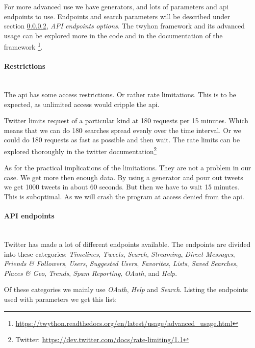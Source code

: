 For more advanced use we have generators, and lots of parameters and api
endpoints to use. Endpoints and search parameters will be described under
section \ref{data:twitter:endpoints}, \textit{API endpoints options}. 
The twyhon framework and its advanced usage can be explored more in the code and
in the documentation of the framework
\footnote{\url{https://twython.readthedocs.org/en/latest/usage/advanced_usage.html}}.
%

\paragraph{Restrictions}
\hspace{0pt}\\
The api has some access restrictions. Or rather rate limitations. This is to be
expected, as unlimited access would cripple the api.

Twitter limits request of a particular kind at 180 requests per 15 minutes.
Which means that we can do 180 searches spread evenly over the time interval. Or
we could do 180 requests as fast as possible and then wait. The rate limits can
be explored thoroughly in the twitter documentation\footnote{Twitter:
\url{https://dev.twitter.com/docs/rate-limiting/1.1}}

As for the practical implications  of the limitations. They are not a problem in
our case. We get more then enough data. By using a generator and pour out tweets
we get 1000 tweets in about 60 seconds. But then we have to wait 15 minutes.
This is suboptimal. As we will crash the program at access denied from the api.  
%

\paragraph{API endpoints}\label{data:twitter:endpoints}
\hspace{0pt}\\
Twitter has made a lot of different endpoints available. The endpoints are
divided into these categories: \textit{Timelines}, \textit{Tweets},
\textit{Search}, \textit{Streaming}, \textit{Direct Messages}, \textit{Friends
\& Followers}, \textit{Users}, \textit{Suggested Users}, \textit{Favorites},
\textit{Lists}, \textit{Saved Searches}, \textit{Places \& Geo},
\textit{Trends}, \textit{Spam Reporting}, \textit{OAuth}, and \textit{Help}.

Of these categories we mainly use \textit{OAuth}, \textit{Help} and
\textit{Search}.
Listing the endpoints used with parameters we get this list: 


